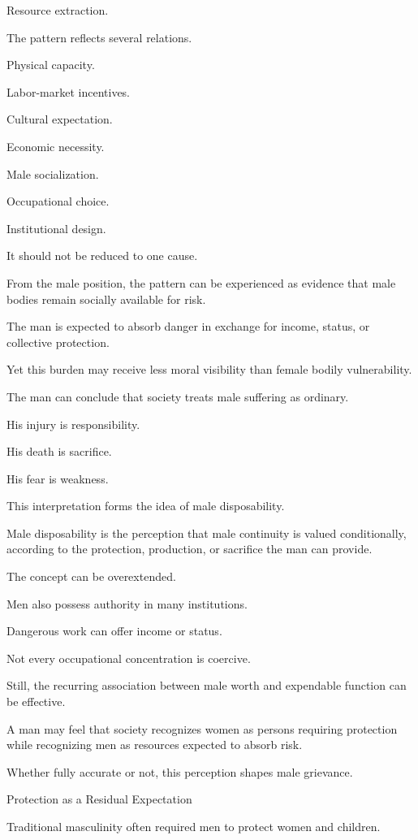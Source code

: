 Resource extraction.

The pattern reflects several relations.

Physical capacity.

Labor-market incentives.

Cultural expectation.

Economic necessity.

Male socialization.

Occupational choice.

Institutional design.

It should not be reduced to one cause.

From the male position, the pattern can be experienced as evidence that male bodies remain socially available for risk.

The man is expected to absorb danger in exchange for income, status, or collective protection.

Yet this burden may receive less moral visibility than female bodily vulnerability.

The man can conclude that society treats male suffering as ordinary.

His injury is responsibility.

His death is sacrifice.

His fear is weakness.

This interpretation forms the idea of male disposability.

Male disposability is the perception that male continuity is valued conditionally, according to the protection, production, or sacrifice the man can provide.

The concept can be overextended.

Men also possess authority in many institutions.

Dangerous work can offer income or status.

Not every occupational concentration is coercive.

Still, the recurring association between male worth and expendable function can be effective.

A man may feel that society recognizes women as persons requiring protection while recognizing men as resources expected to absorb risk.

Whether fully accurate or not, this perception shapes male grievance.

Protection as a Residual Expectation

Traditional masculinity often required men to protect women and children.


